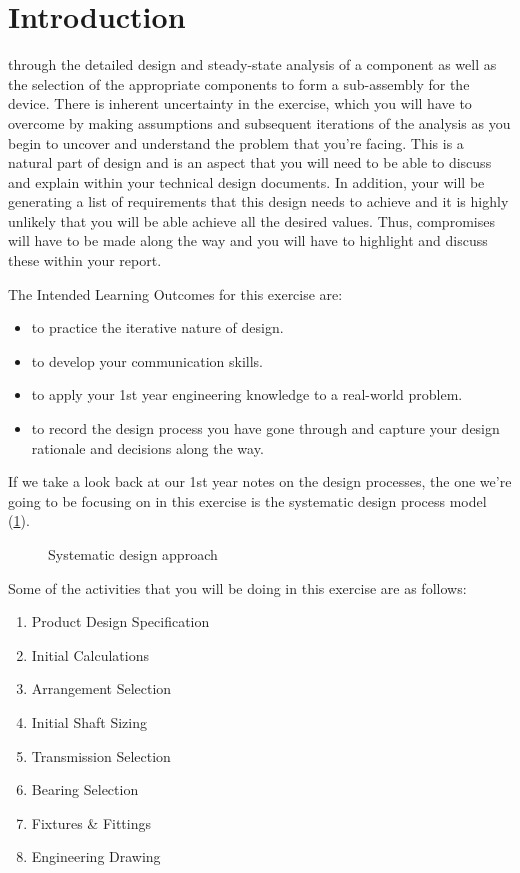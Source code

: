 \section{Introduction}

 through the detailed design and steady-state analysis of a component as well as the selection of the appropriate components to form a sub-assembly for the device. 
There is inherent uncertainty in the exercise, which you will have to overcome by making assumptions and subsequent iterations of the analysis as you begin to uncover and understand the problem that you're facing. 
This is a natural part of design and is an aspect that you will need to be able to discuss and explain within your technical design documents. 
In addition, your will be generating a list of requirements that this design needs to achieve and it is highly unlikely that you will be able achieve all the desired values. 
Thus, compromises will have to be made along the way and you will have to highlight and discuss these within your report.

The Intended Learning Outcomes for this exercise are:

\begin{itemize}
    \item to practice the iterative nature of design.
    \item to develop your communication skills.
    \item to apply your 1st year engineering knowledge to a real-world problem.
    \item to record the design process you have gone through and capture your design rationale and decisions along the way.
\end{itemize}

If we take a look back at our 1st year notes on the design processes, the one we're going to be focusing on in this exercise is the systematic design process model (\cref{fig-vdi}).

\begin{figure}[h!]
    \centering
    
    \caption[Systematic design approach]{Systematic design approach~\citep{pahl2013}}\label{fig-vdi}
\end{figure}

Some of the activities that you will be doing in this exercise are as follows:

\begin{enumerate}
    \item Product Design Specification
    \item Initial Calculations
    \item Arrangement Selection
    \item Initial Shaft Sizing
    \item Transmission Selection
    \item Bearing Selection
    \item Fixtures \& Fittings
    \item Engineering Drawing
\end{enumerate}

